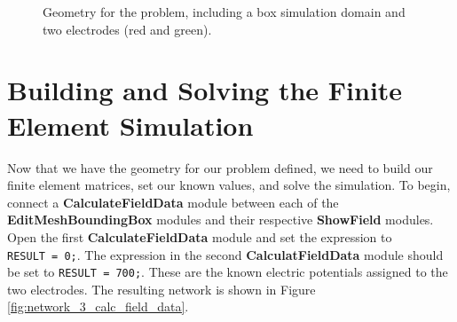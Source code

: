 \documentclass[fleqn,11pt,openany]{book}
\begin{document}
\begin{figure}
\caption{Geometry for the problem, including a box simulation domain
and two electrodes (red and green).}\label{fig:step_2_results}
\end{figure}

\section{Building and Solving the Finite Element Simulation}

Now that we have the geometry for our problem defined, we need to
build our finite element matrices, set our known values, and solve the
simulation. To begin, connect a {\bf CalculateFieldData} module
between each of the {\bf EditMeshBoundingBox} modules and their
respective {\bf ShowField} modules. Open the first {\bf
CalculateFieldData} module and set the expression to {\tt
RESULT~=~0;}. The expression in the second {\bf CalculatFieldData}
module should be set to {\tt RESULT~=~700;}. These are the known
electric potentials assigned to the two electrodes. The resulting
network is shown in Figure \ref{fig:network_3_calc_field_data}.
\end{document}
